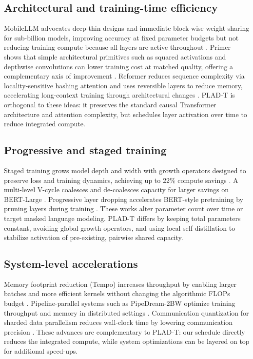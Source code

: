 \documentclass{article}
\begin{document}
\subsection{Architectural and training-time efficiency}
MobileLLM advocates deep-thin designs and immediate block-wise weight sharing for sub-billion models, improving accuracy at fixed parameter budgets but not reducing training compute because all layers are active throughout \cite{liu-2024-mobilellm}. Primer shows that simple architectural primitives such as squared activations and depthwise convolutions can lower training cost at matched quality, offering a complementary axis of improvement \cite{so-2021-searching}. Reformer reduces sequence complexity via locality-sensitive hashing attention and uses reversible layers to reduce memory, accelerating long-context training through architectural changes \cite{kitaev-2020-reformer}. PLAD-T is orthogonal to these ideas: it preserves the standard causal Transformer architecture and attention complexity, but schedules layer activation over time to reduce integrated compute.

\subsection{Progressive and staged training}
Staged training grows model depth and width with growth operators designed to preserve loss and training dynamics, achieving up to 22\% compute savings \cite{shen-2022-staged}. A multi-level V-cycle coalesces and de-coalesces capacity for larger savings on BERT-Large \cite{zou-2024-multi}. Progressive layer dropping accelerates BERT-style pretraining by pruning layers during training \cite{zhang-2020-accelerating}. These works alter parameter count over time or target masked language modeling. PLAD-T differs by keeping total parameters constant, avoiding global growth operators, and using local self-distillation to stabilize activation of pre-existing, pairwise shared capacity.

\subsection{System-level accelerations}
Memory footprint reduction (Tempo) increases throughput by enabling larger batches and more efficient kernels without changing the algorithmic FLOPs budget \cite{andoorveedu-2022-tempo}. Pipeline-parallel systems such as PipeDream-2BW optimize training throughput and memory in distributed settings \cite{narayanan-2020-memory}. Communication quantization for sharded data parallelism reduces wall-clock time by lowering communication precision \cite{jia-2024-toward}. These advances are complementary to PLAD-T: our schedule directly reduces the integrated compute, while system optimizations can be layered on top for additional speed-ups.
\end{document}
